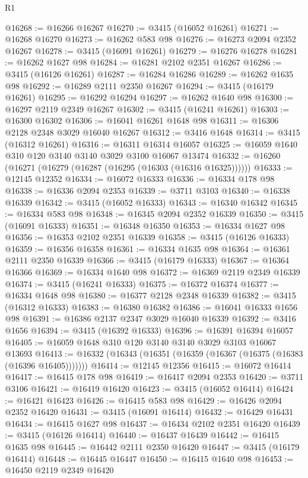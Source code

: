 \begin{lexlean}{R1}
\begin{coremodule}
@16268 := @16266 @16267
@16270 := @3415 (@16052 @16261)
@16271 := @16268 @16270
@16273 := @16262 @583 @98
@16276 := @16273 @2094 @2352 @16267
@16278 := @3415 (@16091 @16261)
@16279 := @16276 @16278
@16281 := @16262 @1627 @98
@16284 := @16281 @2102 @2351 @16267
@16286 := @3415 (@16126 @16261)
@16287 := @16284 @16286
@16289 := @16262 @1635 @98
@16292 := @16289 @2111 @2350 @16267
@16294 := @3415 (@16179 @16261)
@16295 := @16292 @16294
@16297 := @16262 @1640 @98
@16300 := @16297 @2119 @2349 @16267
@16302 := @3415 (@16241 @16261)
@16303 := @16300 @16302
@16306 := @16041 @16261 @1648 @98
@16311 := @16306 @2128 @2348 @3029 @16040 @16267
@16312 := @3416 @1648
@16314 := @3415 (@16312 @16261)
@16316 := @16311 @16314 @16057
@16325 := @16059 @1640 @310 @120 @3140 @3140 @3029 @3100 @16067 @13474
@16332 := @16260 (@16271 (@16279 (@16287 (@16295 (@16303 (@16316 @16325))))))
@16333 := @12145 @12352
@16334 := @16072 @16333
@16336 := @16334 @178 @98
@16338 := @16336 @2094 @2353
@16339 := @3711 @3103
@16340 := @16338 @16339
@16342 := @3415 (@16052 @16333)
@16343 := @16340 @16342
@16345 := @16334 @583 @98
@16348 := @16345 @2094 @2352 @16339
@16350 := @3415 (@16091 @16333)
@16351 := @16348 @16350
@16353 := @16334 @1627 @98
@16356 := @16353 @2102 @2351 @16339
@16358 := @3415 (@16126 @16333)
@16359 := @16356 @16358
@16361 := @16334 @1635 @98
@16364 := @16361 @2111 @2350 @16339
@16366 := @3415 (@16179 @16333)
@16367 := @16364 @16366
@16369 := @16334 @1640 @98
@16372 := @16369 @2119 @2349 @16339
@16374 := @3415 (@16241 @16333)
@16375 := @16372 @16374
@16377 := @16334 @1648 @98
@16380 := @16377 @2128 @2348 @16339
@16382 := @3415 (@16312 @16333)
@16383 := @16380 @16382
@16386 := @16041 @16333 @1656 @98
@16391 := @16386 @2137 @2347 @3029 @16040 @16339
@16392 := @3416 @1656
@16394 := @3415 (@16392 @16333)
@16396 := @16391 @16394 @16057
@16405 := @16059 @1648 @310 @120 @3140 @3140 @3029 @3103 @16067 @13693
@16413 := @16332 (@16343 (@16351 (@16359 (@16367 (@16375 (@16383 (@16396 @16405)))))))
@16414 := @12145 @12356
@16415 := @16072 @16414
@16417 := @16415 @178 @98
@16419 := @16417 @2094 @2353
@16420 := @3711 @3106
@16421 := @16419 @16420
@16423 := @3415 (@16052 @16414)
@16424 := @16421 @16423
@16426 := @16415 @583 @98
@16429 := @16426 @2094 @2352 @16420
@16431 := @3415 (@16091 @16414)
@16432 := @16429 @16431
@16434 := @16415 @1627 @98
@16437 := @16434 @2102 @2351 @16420
@16439 := @3415 (@16126 @16414)
@16440 := @16437 @16439
@16442 := @16415 @1635 @98
@16445 := @16442 @2111 @2350 @16420
@16447 := @3415 (@16179 @16414)
@16448 := @16445 @16447
@16450 := @16415 @1640 @98
@16453 := @16450 @2119 @2349 @16420

\end{coremodule}
\end{lexlean}
